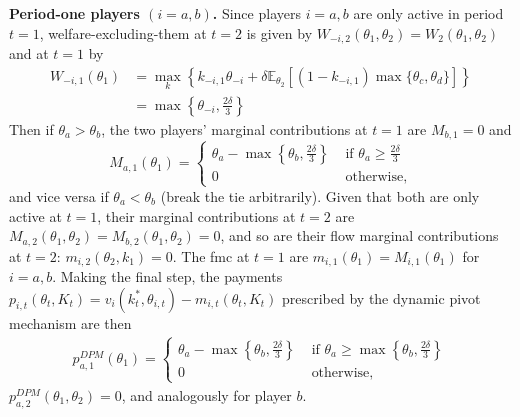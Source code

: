 \documentclass[a4paper]{article}
\begin{document}
\begin{enumerate}
		\textbf{Period-one players $(i=a,b)$.}
		Since players $i=a,b$ are only active in period $t=1$, welfare-excluding-them at $t=2$ is given by $W_{-i,2}(\theta_1,\theta_2) = W_2(\theta_1,\theta_2)$ and at $t=1$ by
		\begin{align*}
			W_{-i,1}(\theta_1) &= \max_k \left\{ k_{-i,1} \theta_{-i} + \delta \mathbb{E}_{\theta_2} \left[(1-k_{-i,1}) \max \{\theta_c,\theta_d\} \right] \right\}
			\\
			&= \max \left\{ \theta_{-i}, \frac{2\delta}{3} \right\}
		\end{align*}
		Then if $\theta_a > \theta_b$, the two players' marginal contributions at $t=1$ are $M_{b,1} = 0$ and
		\begin{equation*}
			M_{a,1} (\theta_1) = \begin{cases}
				\theta_a - \max\left\{ \theta_b, \frac{2\delta}{3} \right\} & \text{ if } \theta_a \geq \frac{2\delta}{3}
				\\
				0 & \text{ otherwise},
			\end{cases}
		\end{equation*}
		and vice versa if $\theta_a < \theta_b$ (break the tie arbitrarily). Given that both are only active at $t=1$, their marginal contributions at $t=2$ are $M_{a,2}(\theta_1,\theta_2) = M_{b,2}(\theta_1,\theta_2) = 0$, and so are their flow marginal contributions at $t=2$: $m_{i,2} (\theta_2, k_1) =0$. The fmc at $t=1$ are $m_{i,1} (\theta_1) = M_{i,1} (\theta_1)$ for $i=a,b$. Making the final step, the payments $p_{i,t}(\theta_t,K_t)=v_i(k_t^*,\theta_{i,t}) - m_{i,t}(\theta_t,K_t)$ prescribed by the dynamic pivot mechanism are then
		\begin{align*}
			p^{DPM}_{a,1} (\theta_1) = \begin{cases}
				\theta_a - \max \left\{ \theta_b, \frac{2\delta}{3} \right\} & \text{ if } \theta_a \geq \max \left\{ \theta_b, \frac{2\delta}{3} \right\}
				\\
				0 & \text{ otherwise},
			\end{cases}
		\end{align*}
		$p^{DPM}_{a,2} (\theta_1,\theta_2) = 0$, and analogously for player $b$.
		

\end{enumerate}
\end{document}
